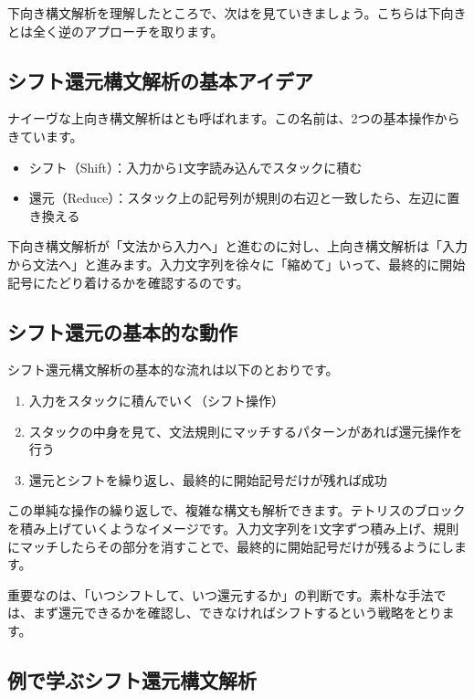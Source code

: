 下向き構文解析を理解したところで、次はを見ていきましょう。こちらは下向きとは全く逆のアプローチを取ります。

\subsection{シフト還元構文解析の基本アイデア}

ナイーヴな上向き構文解析はとも呼ばれます。この名前は、2つの基本操作からきています。

\begin{itemize}
\item
  シフト（Shift）：入力から1文字読み込んでスタックに積む
\item
  還元（Reduce）：スタック上の記号列が規則の右辺と一致したら、左辺に置き換える
\end{itemize}

下向き構文解析が「文法から入力へ」と進むのに対し、上向き構文解析は「入力から文法へ」と進みます。入力文字列を徐々に「縮めて」いって、最終的に開始記号にたどり着けるかを確認するのです。

\subsection{シフト還元の基本的な動作}

シフト還元構文解析の基本的な流れは以下のとおりです。

\begin{enumerate}
\item
  入力をスタックに積んでいく（シフト操作）
\item
  スタックの中身を見て、文法規則にマッチするパターンがあれば還元操作を行う
\item
  還元とシフトを繰り返し、最終的に開始記号だけが残れば成功
\end{enumerate}

この単純な操作の繰り返しで、複雑な構文も解析できます。テトリスのブロックを積み上げていくようなイメージです。入力文字列を1文字ずつ積み上げ、規則にマッチしたらその部分を消すことで、最終的に開始記号だけが残るようにします。

重要なのは、「いつシフトして、いつ還元するか」の判断です。素朴な手法では、まず還元できるかを確認し、できなければシフトするという戦略をとります。

\subsection{例で学ぶシフト還元構文解析}

